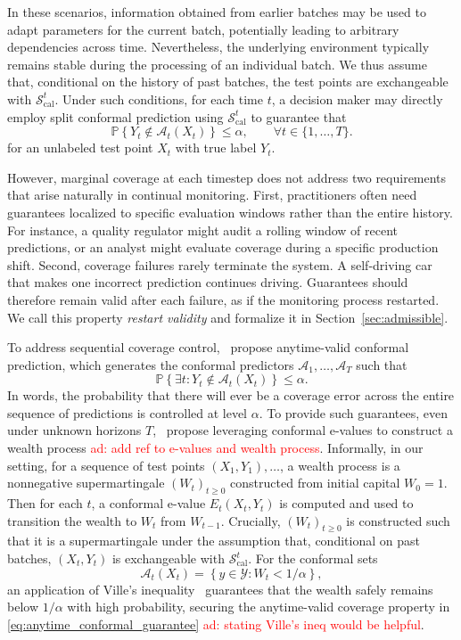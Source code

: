 \documentclass{uai2026} %
\newcommand{\1}{\mathbf{1}}
\newcommand{\prob}{\mathbb{P}}
\newcommand{\ycal}{\mathcal{Y}}
\newcommand{\scal}{\mathcal{S}}
\newcommand{\ens}[1]{\left\{#1\right\}}
\newcommand{\cali}{\mathrm{cal}}
\newcommand{\scalcal}{\scal_{\cali}}
\newcommand{\acal}{\mathcal{A}}
\newcommand{\aymeric}[1]{\textcolor{red}{ad: #1}}
\begin{document}
In these scenarios, information obtained from earlier batches may be used to adapt parameters for the current batch, potentially leading to arbitrary dependencies across time. Nevertheless, the underlying environment typically remains stable during the processing of an individual batch. We thus assume that, conditional on the history of past batches, the test points are exchangeable with $\scalcal^t$. Under such conditions, for each time $t$, a decision maker may directly employ split conformal prediction using $\scalcal^t$ to guarantee that
\begin{equation}
  \label{eq:marginal_horizon}
  \prob\ens{Y_t\not\in \acal_t(X_t)}\le \alpha,\qquad \forall t\in\{1,\dots,T\}.
\end{equation}
for an unlabeled test point $X_t$ with true label $Y_t$.

However, marginal coverage at each timestep does not address two requirements that arise naturally in continual monitoring. First, practitioners often need guarantees localized to specific evaluation windows rather than the entire history. For instance, a quality regulator might audit a rolling window of recent predictions, or an analyst might evaluate coverage during a specific production shift. Second, coverage failures rarely terminate the system. A self-driving car that makes one incorrect prediction continues driving. Guarantees should therefore remain valid after each failure, as if the monitoring process restarted. We call this property \emph{restart validity} and formalize it in Section~\ref{sec:admissible}.

To address sequential coverage control,~\citet{gauthier2025values} propose anytime-valid conformal prediction, which generates the conformal predictors $\acal_1, \ldots, \acal_T$ such that
\begin{equation}
  \label{eq:anytime_conformal_guarantee}
  \prob\ens{\exists t: Y_t\not\in \acal_t(X_t)} \le \alpha.
\end{equation}
In words, the probability that there will ever be a coverage error across the entire sequence of predictions is controlled at level $\alpha$. To provide such guarantees, even under unknown horizons $T$,~\citet{gauthier2025values} propose leveraging conformal e-values to construct a wealth process \aymeric{add ref to e-values and wealth process}. Informally, in our setting, for a sequence of test points $(X_1, Y_1), \ldots$, a wealth process is a nonnegative supermartingale $(W_t)_{t\ge 0}$ constructed from initial capital $W_0=1$. Then for each $t$, a conformal e-value $E_t(X_t, Y_t)$ is computed and used to transition the wealth to $W_t$ from $W_{t-1}$. Crucially, $(W_t)_{t\ge 0}$ is constructed such that it is a supermartingale under the assumption that, conditional on past batches, $(X_t,Y_t)$ is exchangeable with $\scalcal^t$. For the conformal sets
\begin{equation*}
  \acal_t(X_t) = \ens{y \in \ycal : W_{t} < 1/\alpha},
\end{equation*}
an application of Ville's inequality~\citep{ville1939etude} guarantees that the wealth safely remains below $1/\alpha$ with high probability, securing the anytime-valid coverage property in \eqref{eq:anytime_conformal_guarantee} \aymeric{stating Ville's ineq would be helpful}.
\end{document}
